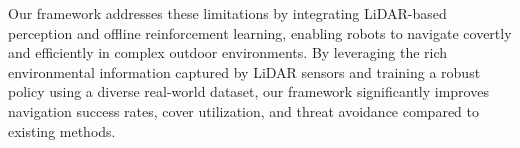 Our framework addresses these limitations by integrating LiDAR-based perception and offline reinforcement learning, enabling robots to navigate covertly and efficiently in complex outdoor environments. By leveraging the rich environmental information captured by LiDAR sensors and training a robust policy using a diverse real-world dataset, our framework significantly improves navigation success rates, cover utilization, and threat avoidance compared to existing methods.